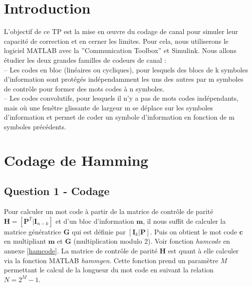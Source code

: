 \documentclass[a4paper, 12pt]{article}
\begin{document}






\clearpage

\section{Introduction}

L’objectif de ce TP est la mise en œuvre du codage de canal pour simuler leur capacité de correction et en cerner les limites. Pour cela, nous utiliserons le logiciel MATLAB avec la ”Communication Toolbox” et Simulink. Nous allons étudier les deux grandes familles de codeurs de canal :\\
– Les codes en bloc (linéaires ou cycliques), pour lesquels des blocs de k symboles d’information sont protégés indépendamment les uns des autres par m symboles de contrôle pour former des mots codes à n symboles.\\
– Les codes convolutifs, pour lesquels il n’y a pas de mots codes indépendants, mais où une fenêtre glissante de largeur m se déplace sur les symboles d’information et permet de coder un symbole d’information en fonction de m symboles précédents.


\section{Codage de Hamming}

\subsection{Question 1 - Codage}

Pour calculer un mot code à partir de la matrice de contrôle de parité $\mathbf{H} = [\mathbf{P}^T | \mathbf{I}_{n-k}]$ et d'un bloc d'information $\mathbf{m}$, il nous suffit de calculer la matrice génératrice $\mathbf{G}$ qui est définie par $[\mathbf{I}_k | \mathbf{P}]$. Puis on obtient le mot code $\mathbf{c}$ en multipliant $\mathbf{m}$ et $\mathbf{G}$ (multiplication modulo 2). Voir fonction \textit{hamcode} en annexe \ref{hamcode}. La matrice de contrôle de parité $\mathbf{H}$ est quant à elle calculer via la fonction MATLAB \textit{hammgen}. Cette fonction prend un paramètre $M$ permettant le calcul de la longueur du mot code en suivant la relation $N=2^M-1$. \\
\end{document}
